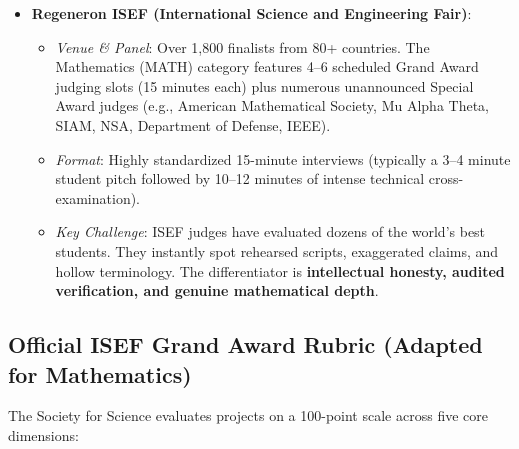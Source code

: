 \documentclass[11pt,letterpaper]{article}
\begin{document}
\begin{itemize}[leftmargin=*]
    \item \textbf{Regeneron ISEF (International Science and Engineering Fair)}:
    \begin{itemize}
        \item \textit{Venue \& Panel}: Over 1,800 finalists from 80+ countries. The Mathematics (MATH) category features 4--6 scheduled Grand Award judging slots (15 minutes each) plus numerous unannounced Special Award judges (e.g., American Mathematical Society, Mu Alpha Theta, SIAM, NSA, Department of Defense, IEEE).
        \item \textit{Format}: Highly standardized 15-minute interviews (typically a 3--4 minute student pitch followed by 10--12 minutes of intense technical cross-examination).
        \item \textit{Key Challenge}: ISEF judges have evaluated dozens of the world's best students. They instantly spot rehearsed scripts, exaggerated claims, and hollow terminology. The differentiator is \textbf{intellectual honesty, audited verification, and genuine mathematical depth}.
    \end{itemize}
\end{itemize}

\subsection{Official ISEF Grand Award Rubric (Adapted for Mathematics)}

The Society for Science evaluates projects on a 100-point scale across five core dimensions:
\end{document}
